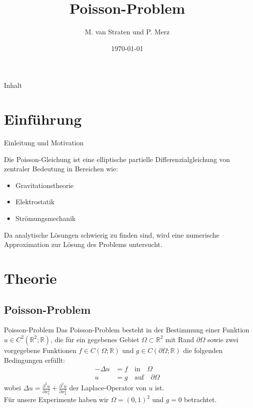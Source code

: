 \documentclass[9pt, t]{beamer}
\title{Poisson-Problem}
\author{M. van Straten und P. Merz}
\institute{Humboldt-Universität zu Berlin \\
           Wintersemester 2024}
\date{\today}
\begin{document}
\maketitle

\begin{frame}{Inhalt}
    \tableofcontents[pausesections]
\end{frame}


\section{Einführung}


\begin{frame}{Einleitung und Motivation}

Die Poisson-Gleichung ist eine elliptische partielle Differenzialgleichung von zentraler Bedeutung in Bereichen wie:

\begin{itemize}
    \item Gravitationstheorie
    \item Elektrostatik
    \item Strömungsmechanik
\end{itemize}

Da analytische Lösungen schwierig zu finden sind, wird eine numerische Approximation zur Lösung des Problems untersucht.
\end{frame}


\section{Theorie}

\subsection{Poisson-Problem}
\begin{frame}{Poisson-Problem}
  Das Poisson-Problem besteht in der Bestimmung einer Funktion \(u \in C^2(\mathbb{R}^2; \mathbb{R})\), die für ein gegebenes Gebiet \(\Omega \subset \mathbb{R}^2\) mit Rand \(\partial \Omega\) sowie zwei vorgegebene Funktionen \(f \in C(\Omega; \mathbb{R})\) und \(g \in C(\partial \Omega; \mathbb{R})\) die folgenden Bedingungen erfüllt:
  \begin{align*} 
    -\Delta u &= f \quad \text{in} \quad \Omega 
    \\ 
            u &= g \quad \text{auf} \quad \partial \Omega
  \end{align*}
  wobei \(\Delta u = \frac{\partial^2 u}{\partial x_1^2} + \frac{\partial^2 u}{\partial x_2^2}\) der Laplace-Operator von \(u\) ist. \\
  Für unsere Experimente haben wir \(\Omega = {(0, 1)^2}\) und \(g = 0\) betrachtet.
\end{frame}  
\end{document}
